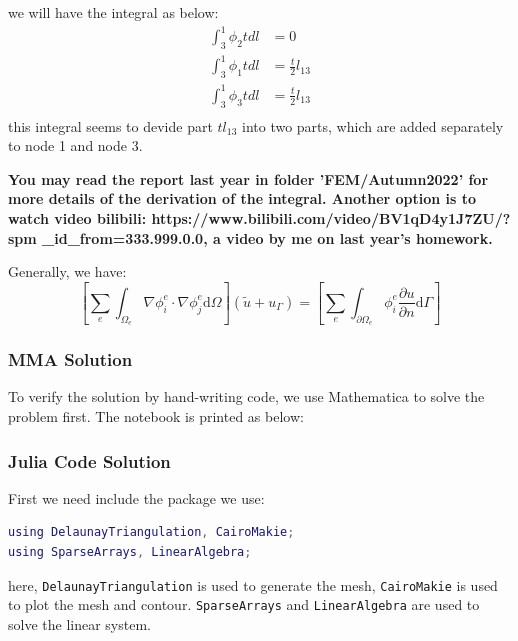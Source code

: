 we will have the integral as below:
\begin{equation}
    \begin{aligned}
        \int_3^1 \phi_2 t dl &= 0\\
        \int_3^1 \phi_1 t dl &= \frac{t}{2}l_{13}\\
        \int_3^1 \phi_3 t dl &= \frac{t}{2}l_{13}\\
    \end{aligned}
\end{equation}
this integral seems to devide part $tl_{13}$ into two parts,
which are added separately to node 1 and node 3.

\textbf{You may read the report last year in folder 'FEM/Autumn2022' for more details 
of the derivation of the integral.
Another option is to watch video bilibili:
https://www.bilibili.com/video/BV1qD4y1J7ZU/?spm
\_id\_from=333.999.0.0,
a video by me on last year's homework.}

Generally, we have:
\begin{equation}
    \left[\sum_e \int_{\Omega_e} \nabla \phi_i^e \cdot \nabla \phi_j^e \mathrm{d}\Omega\right]
    (\tilde{u}+u_\Gamma)=
    \left[
        \sum_e \int_{\partial \Omega_e} \phi_i^e \frac{\partial u}{\partial n} \mathrm{d}\Gamma
    \right]
\end{equation}

\subsubsection{MMA Solution}

To verify the solution by hand-writing code, 
we use Mathematica to solve the problem first.
The notebook is printed as below:



\subsubsection{Julia Code Solution}

First we need include the package we use:
\begin{lstlisting}[language=matlab]
using DelaunayTriangulation, CairoMakie;
using SparseArrays, LinearAlgebra;
\end{lstlisting}
here, \verb|DelaunayTriangulation| is used to generate the mesh,
\verb|CairoMakie| is used to plot the mesh and contour.
\verb|SparseArrays| and \verb|LinearAlgebra| are used to solve the linear system.

